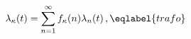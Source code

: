 \begin{equation}
\lambda_\kappa(t)=\sum_{n=1}^\infty f_\kappa(n)\lambda_n(t) \,,
\eqlabel{trafo}
\end{equation}

